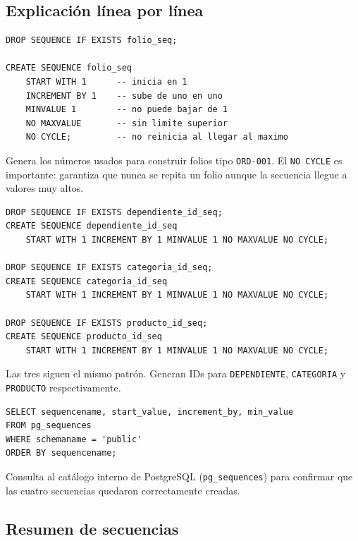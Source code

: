 \documentclass[12pt, a4paper]{article}
\begin{document}
\subsection{Explicaci\'on l\'inea por l\'inea}

\begin{lstlisting}[caption={Secuencia para folios de orden}]
DROP SEQUENCE IF EXISTS folio_seq;

CREATE SEQUENCE folio_seq
    START WITH 1      -- inicia en 1
    INCREMENT BY 1    -- sube de uno en uno
    MINVALUE 1        -- no puede bajar de 1
    NO MAXVALUE       -- sin limite superior
    NO CYCLE;         -- no reinicia al llegar al maximo
\end{lstlisting}

Genera los n\'umeros usados para construir folios tipo \texttt{ORD-001}.
El \texttt{NO CYCLE} es importante: garantiza que nunca se repita un folio aunque la secuencia llegue a valores muy altos.

\begin{lstlisting}[caption={Secuencias para llaves artificiales}]
DROP SEQUENCE IF EXISTS dependiente_id_seq;
CREATE SEQUENCE dependiente_id_seq
    START WITH 1 INCREMENT BY 1 MINVALUE 1 NO MAXVALUE NO CYCLE;

DROP SEQUENCE IF EXISTS categoria_id_seq;
CREATE SEQUENCE categoria_id_seq
    START WITH 1 INCREMENT BY 1 MINVALUE 1 NO MAXVALUE NO CYCLE;

DROP SEQUENCE IF EXISTS producto_id_seq;
CREATE SEQUENCE producto_id_seq
    START WITH 1 INCREMENT BY 1 MINVALUE 1 NO MAXVALUE NO CYCLE;
\end{lstlisting}

Las tres siguen el mismo patr\'on. Generan IDs para \texttt{DEPENDIENTE}, \texttt{CATEGORIA} y \texttt{PRODUCTO} respectivamente.

\begin{lstlisting}[caption={Verificaci\'on de secuencias creadas}]
SELECT sequencename, start_value, increment_by, min_value
FROM pg_sequences
WHERE schemaname = 'public'
ORDER BY sequencename;
\end{lstlisting}

Consulta al cat\'alogo interno de PostgreSQL (\texttt{pg\_sequences}) para confirmar que las cuatro secuencias quedaron correctamente creadas.

\subsection{Resumen de secuencias}
\end{document}
